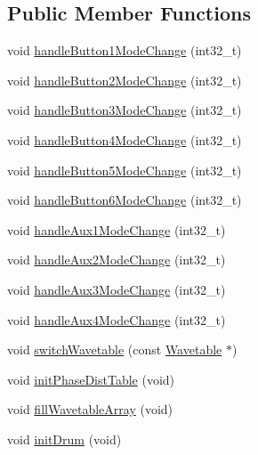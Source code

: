 \subsection*{Public Member Functions}
\begin{DoxyCompactItemize}
\item 
void \mbox{\hyperlink{class_via_meta_a7cc6b36d441268ecdd939bc619b544b7}{handle\+Button1\+Mode\+Change}} (int32\+\_\+t)
\item 
void \mbox{\hyperlink{class_via_meta_a6214bd154f0bad9b3a3a164cf2c86a37}{handle\+Button2\+Mode\+Change}} (int32\+\_\+t)
\item 
void \mbox{\hyperlink{class_via_meta_a64f69f2c1886f2d5748d2a1bda68d29e}{handle\+Button3\+Mode\+Change}} (int32\+\_\+t)
\item 
void \mbox{\hyperlink{class_via_meta_a791172b5d929d0a8d26b85ffbb7154fc}{handle\+Button4\+Mode\+Change}} (int32\+\_\+t)
\item 
void \mbox{\hyperlink{class_via_meta_a8840b0feb7bd93e159ab5567b2071944}{handle\+Button5\+Mode\+Change}} (int32\+\_\+t)
\item 
void \mbox{\hyperlink{class_via_meta_a0024df4fef40405972532536f4cc0226}{handle\+Button6\+Mode\+Change}} (int32\+\_\+t)
\item 
void \mbox{\hyperlink{class_via_meta_a0239a011fd549aa363d68c7fcc5f5d91}{handle\+Aux1\+Mode\+Change}} (int32\+\_\+t)
\item 
void \mbox{\hyperlink{class_via_meta_a8b637a702d3e12878b6d3e40c11309d1}{handle\+Aux2\+Mode\+Change}} (int32\+\_\+t)
\item 
void \mbox{\hyperlink{class_via_meta_aa13d82e4b9811d169ac68aeb0cc05850}{handle\+Aux3\+Mode\+Change}} (int32\+\_\+t)
\item 
void \mbox{\hyperlink{class_via_meta_af5912a56e45c8bf6e1c6412cfbae3179}{handle\+Aux4\+Mode\+Change}} (int32\+\_\+t)
\item 
void \mbox{\hyperlink{class_via_meta_a46bc714c10dfcb4f6900ad0518ecbf51}{switch\+Wavetable}} (const \mbox{\hyperlink{struct_wavetable}{Wavetable}} $\ast$)
\item 
void \mbox{\hyperlink{class_via_meta_a8437126f7bb29c15b4dc5953a91e536f}{init\+Phase\+Dist\+Table}} (void)
\item 
void \mbox{\hyperlink{class_via_meta_a08af168b0e35016e949820875aa203ff}{fill\+Wavetable\+Array}} (void)
\item 
void \mbox{\hyperlink{class_via_meta_a180d1594d18fb1eb200aa9f3563f581c}{init\+Drum}} (void)
\item 

\end{DoxyCompactItemize}
